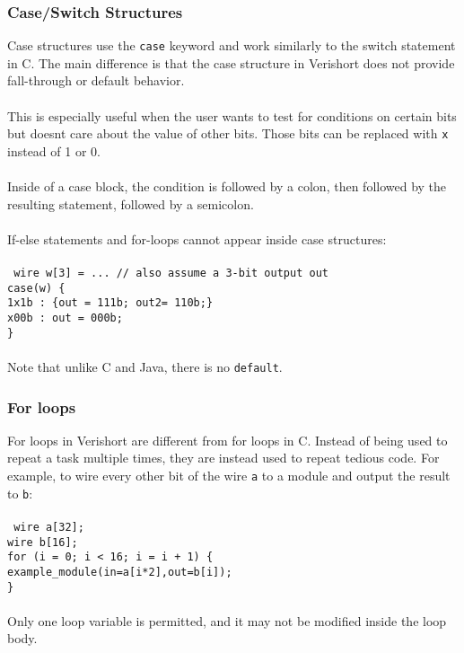 \documentclass[letterpaper,11pt]{article}
\newcommand{\tab}{\hspace*{2em}}
\begin{document}
        \subsubsection{Case\slash Switch Structures}
        Case structures use the \texttt{case} keyword and work similarly to the switch statement in C.  The main 
        difference is that the case structure in Verishort does not provide fall-through or default behavior.\\\\
        This is especially useful when the user wants to test for conditions on certain bits but doesnt care 
        about the value of other bits.  Those bits can be replaced with \texttt{x} instead of 1 or 0.\\\\
        Inside of a case block, the condition is followed by a colon, then followed by the resulting statement, 
        followed by a semicolon.\\\\
        If-else statements and for-loops cannot appear inside case structures: \\\\
        \texttt{
        wire w[3] = ... \tab // also assume a 3-bit output out \\
        case(w) \{ \\
        \tab 1x1b : \{out = 111b; out2= 110b;\} \\
        \tab x00b : out = 000b; \\
        \}} \\\\ Note that unlike C and Java, there is no \texttt{default}.
        
        \subsubsection{For loops}
        For loops in Verishort are different from for loops in C.  Instead of being used to repeat a task multiple times, they are instead used to repeat tedious code.  For example, to wire every other bit of the wire \texttt{a} to a module and output the result to \texttt{b}:\\\\
\texttt{
wire a[32];\\
wire b[16];\\
for (i = 0; i < 16; i = i + 1) \{\\
	\tab example\_module(in=a[i*2],out=b[i]);\\
\} } \\\\
		Only one loop variable is permitted, and it may not be modified inside the loop body.
\end{document}
